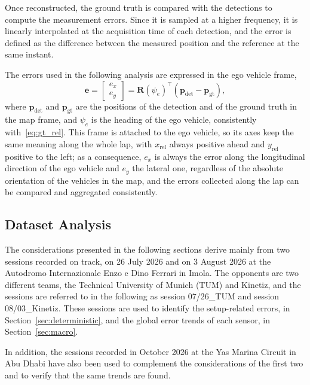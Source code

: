 Once reconstructed, the ground truth is compared with the detections to compute the measurement errors. Since it is sampled at a higher frequency, it is linearly interpolated at the acquisition time of each detection, and the error is defined as the difference between the measured position and the reference at the same instant.

The errors used in the following analysis are expressed in the ego vehicle frame,
\begin{equation}
    \mathbf{e} =
    \begin{bmatrix} e_x \\ e_y \end{bmatrix}
    = \mathbf{R}(\psi_e)^\top \left(\mathbf{p}_{\mathrm{det}} - \mathbf{p}_{\mathrm{gt}}\right),
    \label{eq:err_ego}
\end{equation}
where $\mathbf{p}_{\mathrm{det}}$ and $\mathbf{p}_{\mathrm{gt}}$ are the positions of the
detection and of the ground truth in the map frame, and $\psi_e$ is the heading of the ego
vehicle, consistently with~\eqref{eq:gt_rel}. This frame is attached to the ego vehicle,
so its axes keep the same meaning along the whole lap, with $x_{\mathrm{rel}}$ always
positive ahead  and $y_{\mathrm{rel}}$ positive to the left; as a
consequence, $e_x$ is always the error along the longitudinal direction of the ego vehicle
and $e_y$ the lateral one, regardless of the absolute orientation of the vehicles in the
map, and the errors collected along the lap can be compared and aggregated consistently.

\subsection{Dataset Analysis}
\label{sec:datasets}

The considerations presented in the following sections derive mainly from two sessions
recorded on track,
on 26 July 2026 and on 3 August 2026 at the Autodromo Internazionale Enzo e Dino Ferrari
in Imola. The opponents are two different teams, the Technical University of Munich (TUM)
and Kinetiz, and the sessions are referred to in the following as
session 07/26\_TUM and session 08/03\_Kinetiz. These sessions are used to identify the
setup-related errors, in Section~\ref{sec:deterministic}, and the global error trends of
each sensor, in Section~\ref{sec:macro}.

In addition, the sessions recorded in October 2026 at the Yas Marina Circuit in Abu Dhabi
have also been used to complement the considerations of the first two and to verify that the same trends are found.

